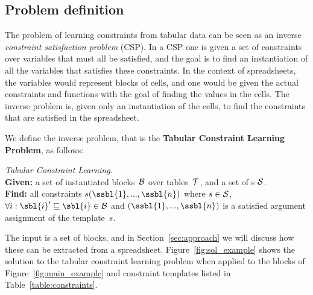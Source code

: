 \subsection{Problem definition}\label{sec:problem_statement}
The problem of learning constraints from tabular data can be seen as an inverse {\em constraint satisfaction problem} (CSP).
In a CSP one is given a set of constraints over variables that must all be satisfied, and the goal is to find an instantiation of all the variables that satisfies these constraints.
In the context of spreadsheets, the variables would represent blocks of cells, and one would be given the actual constraints and functions with the goal of finding the values in the cells.
The inverse problem is, given only an instantiation of the cells, to find the constraints that are satisfied in the spreadsheet.

We define the inverse problem, that is the {\bf Tabular Constraint Learning Problem}, as follows:
%
\begin{definition} \textit{Tabular Constraint Learning.}\label{def:problem_statement}\\
{\bf Given:} a set of instantiated blocks~${\cal B}$ over tables~${\cal T}$, and a set of {\template}s ${\cal S}$.\\
{\bf Find:} all constraints $s(\ssbl{1}, ..., \ssbl{n})$ where $s \in {\cal S}$, $\forall i: \sbl{i}' \sqsubseteq \sbl{i} \in {\cal B}$ and $(\ssbl{1}, ..., \ssbl{n})$ is a satisfied argument assignment of the template~$s$.
\end{definition}


The input is a set of blocks, and in Section~\ref{sec:approach} we will discuss how these can be extracted from a spreadsheet.
Figure~\ref{fig:sol_example} shows the solution to the tabular constraint learning problem when applied to the blocks of Figure~\ref{fig:main_example} and constraint templates listed in Table~\ref{table:constraints}.

